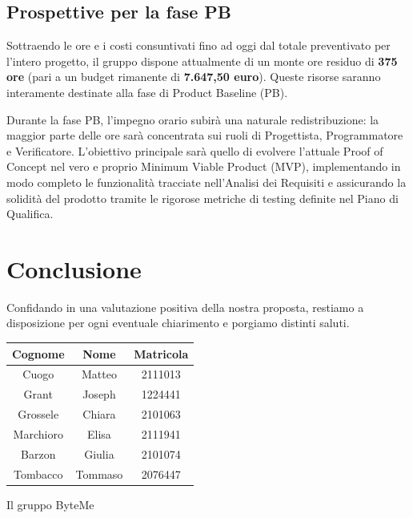 \documentclass[11pt,a4paper]{article}
\begin{document}
\subsection*{Prospettive per la fase PB}
Sottraendo le ore e i costi consuntivati fino ad oggi dal totale preventivato per l'intero progetto, il gruppo dispone attualmente di un monte ore residuo di \textbf{375 ore} (pari a un budget rimanente di \textbf{7.647,50 euro}). Queste risorse saranno interamente destinate alla fase di Product Baseline (PB).

Durante la fase PB, l'impegno orario subirà una naturale redistribuzione: la maggior parte delle ore sarà concentrata sui ruoli di Progettista, Programmatore e Verificatore. L'obiettivo principale sarà quello di evolvere l'attuale Proof of Concept nel vero e proprio Minimum Viable Product (MVP), implementando in modo completo le funzionalità tracciate nell'Analisi dei Requisiti e assicurando la solidità del prodotto tramite le rigorose metriche di testing definite nel Piano di Qualifica.


\newpage
\section{Conclusione}
Confidando in una valutazione positiva della nostra proposta, restiamo a disposizione per ogni eventuale chiarimento e porgiamo distinti saluti.

\begin{table}[H]
    \centering
    \begin{tabular}{|c|c|c|}
        \hline
        \textbf{Cognome} & \textbf{Nome} & \textbf{Matricola} \\
        \hline
        Cuogo & Matteo & 2111013 \\
        \hline
        Grant & Joseph & 1224441 \\
        \hline
        Grossele & Chiara & 2101063 \\
        \hline
        Marchioro & Elisa & 2111941 \\
        \hline
        Barzon & Giulia & 2101074 \\
        \hline
        Tombacco & Tommaso & 2076447 \\
        \hline
    \end{tabular}
\end{table}

\hfill Il gruppo ByteMe
\end{document}
